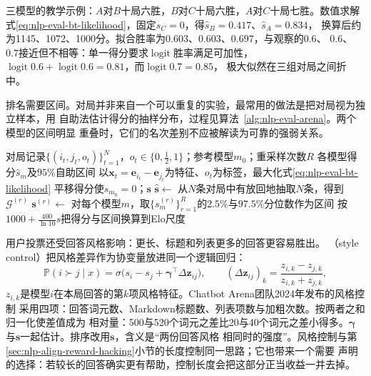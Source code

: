 三模型的教学示例：$A$对$B$十局六胜，$B$对$C$十局六胜，$A$对$C$十局七胜。数值求解
式\eqref{eq:nlp-eval-bt-likelihood}，固定$s_C=0$，得$\hat s_B=0.417$、$\hat s_A=0.834$，
换算后约为1145、1072、1000分。拟合胜率为$0.603$、$0.603$、$0.697$，与观察的$0.6$、
$0.6$、$0.7$接近但不相等：单一得分要求$\operatorname{logit}$胜率满足可加性，
$\operatorname{logit}0.6+\operatorname{logit}0.6=0.81$，而$\operatorname{logit}0.7=0.85$，
极大似然在三组对局之间折中。

排名需要区间。对局并非来自一个可以重复的实验，最常用的做法是把对局视为独立样本，用
自助法估计得分的抽样分布，过程见算法~\ref{alg:nlp-eval-arena}。两个模型的区间明显
重叠时，它们的名次差别不应被解读为可靠的强弱关系。

\begin{algorithm}
  \label{alg:nlp-eval-arena}
  \begin{algorithmic}[1]
    \Require 对局记录$\{(i_t,j_t,o_t)\}_{t=1}^{N}$，$o_t\in\{0,\tfrac12,1\}$；参考模型$m_0$；重采样次数$R$
    \Ensure 各模型得分$\hat s_m$及$95\%$自助区间
      \State 以$\bm x_t=\bm e_{i_t}-\bm e_{j_t}$为特征、$o_t$为标签，最大化式\eqref{eq:nlp-eval-bt-likelihood}
      \State 平移得分使$s_{m_0}=0$；\Return $\bm s$
    \EndFunction
    \State $\hat{\bm s}\gets$
      \State 从$N$条对局中有放回地抽取$N$条，得到$\mathcal G^{(r)}$
      \State $\bm s^{(r)}\gets$
    \EndFor
    \State 对每个模型$m$，取$\{s^{(r)}_m\}_{r=1}^{R}$的$2.5\%$与$97.5\%$分位数作为区间
    \State 按$1000+\frac{400}{\ln10}s$把得分与区间换算到Elo尺度
  \end{algorithmic}
\end{algorithm}

用户投票还受回答风格影响：更长、标题和列表更多的回答更容易胜出。
（style control）把风格差异作为协变量放进同一个逻辑回归：
\begin{equation}
 \mathbb P(i\succ j\mid x)
 =\sigma\bigl(s_i-s_j+\bm\gamma^{\top}\Delta\bm z_{ij}\bigr),\qquad
 (\Delta\bm z_{ij})_k=\frac{z_{i,k}-z_{j,k}}{z_{i,k}+z_{j,k}},
 \label{eq:nlp-eval-style-control}
\end{equation}
$z_{i,k}$是模型$i$在本局回答的第$k$项风格特征。Chatbot Arena团队2024年发布的风格控制
采用四项：回答词元数、Markdown标题数、列表项数与加粗次数。按两者之和归一化使差值成为
相对量：500与520个词元之差比20与40个词元之差小得多。$\bm\gamma$与$\bm s$一起估计。排序改用$\bm s$，含义是“两份回答风格
相同时的强度”。风格控制与第\ref{sec:nlp-align-reward-hacking}小节的长度控制同一思路；它也带来一个需要
声明的选择：若较长的回答确实更有帮助，控制长度会把这部分正当收益一并去掉。

